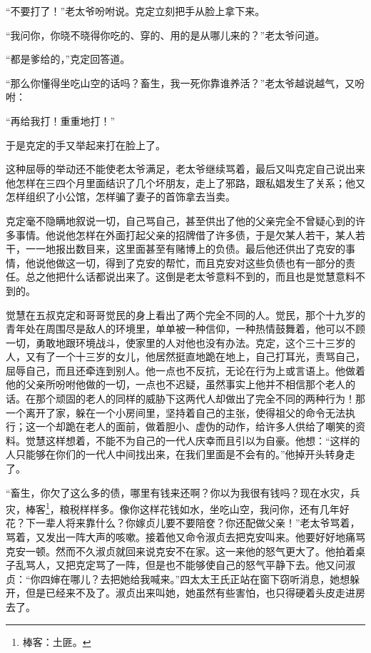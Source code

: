 \par “不要打了！”老太爷吩咐说。克定立刻把手从脸上拿下来。
\par “我问你，你晓不晓得你吃的、穿的、用的是从哪儿来的？”老太爷问道。
\par “都是爹给的，”克定回答道。
\par “那么你懂得坐吃山空的话吗？畜生，我一死你靠谁养活？”老太爷越说越气，又吩咐：
\par “再给我打！重重地打！”
\par 于是克定的手又举起来打在脸上了。
\par 这种屈辱的举动还不能使老太爷满足，老太爷继续骂着，最后又叫克定自己说出来他怎样在三四个月里面结识了几个坏朋友，走上了邪路，跟私娼发生了关系；他又怎样组织了小公馆，怎样骗了妻子的首饰拿去当卖。
\par 克定毫不隐瞒地叙说一切，自己骂自己，甚至供出了他的父亲完全不曾疑心到的许多事情。他说他怎样在外面打起父亲的招牌借了许多债，于是欠某人若干，某人若干，一一地报出数目来，这里面甚至有赌博上的负债。最后他还供出了克安的事情，他说他做这一切，得到了克安的帮忙，而且克安对这些负债也有一部分的责任。总之他把什么话都说出来了。这倒是老太爷意料不到的，而且也是觉慧意料不到的。
\par 觉慧在五叔克定和哥哥觉民的身上看出了两个完全不同的人。觉民，那个十九岁的青年处在周围尽是敌人的环境里，单单被一种信仰，一种热情鼓舞着，他可以不顾一切，勇敢地跟环境战斗，使家里的人对他也没有办法。克定，这个三十三岁的人，又有了一个十三岁的女儿，他居然挺直地跪在地上，自己打耳光，责骂自己，屈辱自己，而且还牵连到别人。他一点也不反抗，无论在行为上或言语上。他做着他的父亲所吩咐他做的一切，一点也不迟疑，虽然事实上他并不相信那个老人的话。在那个顽固的老人的同样的威胁下这两代人却做出了完全不同的两种行为！那一个离开了家，躲在一个小房间里，坚持着自己的主张，使得祖父的命令无法执行；这一个却跪在老人的面前，做着胆小、虚伪的动作，给许多人供给了嘲笑的资料。觉慧这样想着，不能不为自己的一代人庆幸而且引以为自豪。他想：“这样的人只能够在你们的一代人中间找出来，在我们里面是不会有的。”他掉开头转身走了。
\par “畜生，你欠了这么多的债，哪里有钱来还啊？你以为我很有钱吗？现在水灾，兵灾，棒客\footnote{棒客：土匪。}，粮税样样多。像你这样花钱如水，坐吃山空，我问你，还有几年好花？下一辈人将来靠什么？你嫁贞儿要不要陪奁？你还配做父亲！”老太爷骂着，骂着，又发出一阵大声的咳嗽。接着他又命令淑贞去把克安叫来。他要好好地痛骂克安一顿。然而不久淑贞就回来说克安不在家。这一来他的怒气更大了。他拍着桌子乱骂人，又把克定骂了一阵，但是也不能够使自己的怒气平静下去。他又问淑贞：“你四婶在哪儿？去把她给我喊来。”四太太王氏正站在窗下窃听消息，她想躲开，但是已经来不及了。淑贞出来叫她，她虽然有些害怕，也只得硬着头皮走进房去了。
